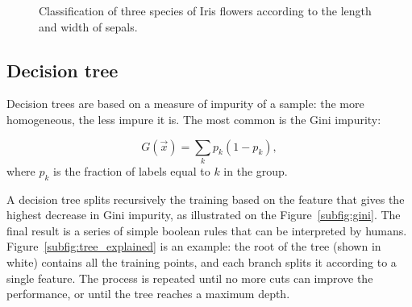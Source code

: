 \begin{figure}[htb]
	\centering
	\hfill
	\caption{Classification of three species of Iris flowers according to the length and width of sepals.}\label{fig:knn}
\end{figure}

\subsection{Decision tree}\label{sec:decision_tree}
Decision trees are based on a measure of impurity of a sample: the more homogeneous, the less impure it is.
The most common is the Gini impurity:

\[ G(\vec x) = \sum_k p_{k} (1-p_k),\]
where $p_k$ is the fraction of labels equal to $k$ in the group.

A decision tree splits recursively the training based on the feature that gives the highest decrease in Gini impurity, as illustrated on the Figure~\ref{subfig:gini}.
The final result is a series of simple boolean rules that can be interpreted by humans.
Figure~\ref{subfig:tree_explained} is an example: the root of the tree (shown in white) contains all the training points, and each branch splits it according to a single feature.
The process is repeated until no more cuts can improve the performance, or until the tree reaches a maximum depth.

